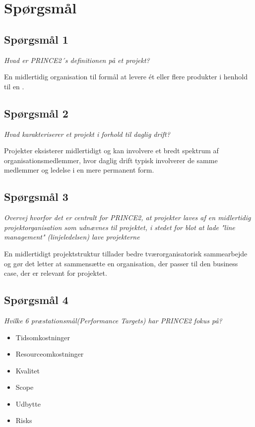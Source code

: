 \chapter{Spørgsmål}

\section{Spørgsmål 1}
\textit{Hvad er PRINCE2´s definitionen på et projekt?}

En midlertidig organisation til formål at levere ét eller flere produkter i henhold til en .

\section{Spørgsmål 2}
\textit{Hvad karakteriserer et projekt i forhold til daglig drift?}

Projekter eksisterer midlertidigt og kan involvere et bredt spektrum af organisationsmedlemmer, hvor daglig drift typisk involverer de samme medlemmer og ledelse i en mere permanent form.


\section{Spørgsmål 3}
\textit{Overvej hvorfor det er centralt for PRINCE2, at projekter laves af en midlertidig projektorganisation som udnævnes til projektet, i stedet for blot at lade "line management" (linjeledelsen) lave projekterne}

En midlertidigt projektstruktur tillader bedre tværorganisatorisk sammearbejde og gør det letter at sammensætte en organisation, der passer til den business case, der er relevant for projektet.

\section{Spørgsmål 4}
\textit{Hvilke 6 præstationsmål(Performance Targets) har PRINCE2 fokus på?}

\begin{itemize}
    \item Tidsomkostninger
    \item Resourceomkostninger
    \item Kvalitet
    \item Scope
    \item Udbytte
    \item Risks
\end{itemize}

